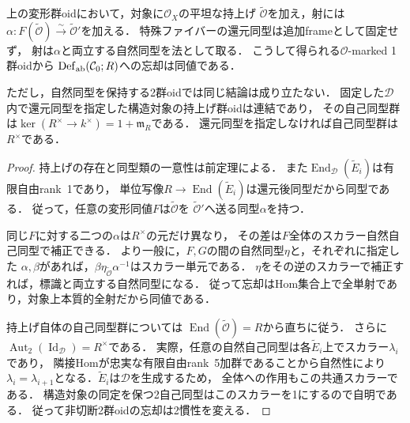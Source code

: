 \begin{proposition}[構造対象の標識を忘れる局所比較]
\label{prop:abel-cubic-o-marking}
上の変形群oidにおいて，対象に$\mathcal O_X$の平坦な持上げ
$\widetilde{\mathcal O}$を加え，射には
$\alpha:F(\widetilde{\mathcal O})\xrightarrow{\sim}\widetilde{\mathcal O}'$を加える．
特殊ファイバーの還元同型は追加frameとして固定せず，
射は$\alpha$と両立する自然同型を法として取る．
こうして得られる$\mathcal O$-marked 1群oidから
$\operatorname{Def}_{\rm ab}(\mathcal C_0;R)$への忘却は同値である．

ただし，自然同型を保持する2群oidでは同じ結論は成り立たない．
固定した$\mathcal D$内で還元同型を指定した構造対象の持上げ群oidは連結であり，
その自己同型群は$\ker(R^\times\to k^\times)=1+\mathfrak m_R$である．
還元同型を指定しなければ自己同型群は$R^\times$である．
\end{proposition}
\begin{proof}
持上げの存在と同型類の一意性は前定理による．
また$\operatorname{End}_{\mathcal D}(\widetilde E_i)$は有限自由rank~1であり，
単位写像$R\to\operatorname{End}(\widetilde E_i)$は還元後同型だから同型である．
従って，任意の変形同値$F$は$\widetilde{\mathcal O}$を
$\widetilde{\mathcal O}'$へ送る同型$\alpha$を持つ．

同じ$F$に対する二つの$\alpha$は$R^\times$の元だけ異なり，
その差は$F$全体のスカラー自然自己同型で補正できる．
より一般に，$F,G$の間の自然同型$\eta$と，それぞれに指定した
$\alpha,\beta$があれば，$\beta\eta_{\widetilde{\mathcal O}}\alpha^{-1}$はスカラー単元である．
$\eta$をその逆のスカラーで補正すれば，標識と両立する自然同型になる．
従って忘却はHom集合上で全単射であり，対象上本質的全射だから同値である．

持上げ自体の自己同型群については
$\operatorname{End}(\widetilde{\mathcal O})=R$から直ちに従う．
さらに$\operatorname{Aut}_2(\operatorname{Id}_{\mathcal D})=R^\times$である．
実際，任意の自然自己同型は各$\widetilde E_i$上でスカラー$\lambda_i$であり，
隣接Homが忠実な有限自由rank~5加群であることから自然性により
$\lambda_i=\lambda_{i+1}$となる．$\widetilde E_i$は$\mathcal D$を生成するため，
全体への作用もこの共通スカラーである．
構造対象の同定を保つ2自己同型はこのスカラーを1にするので自明である．
従って非切断2群oidの忘却は2慣性を変える．
\end{proof}

